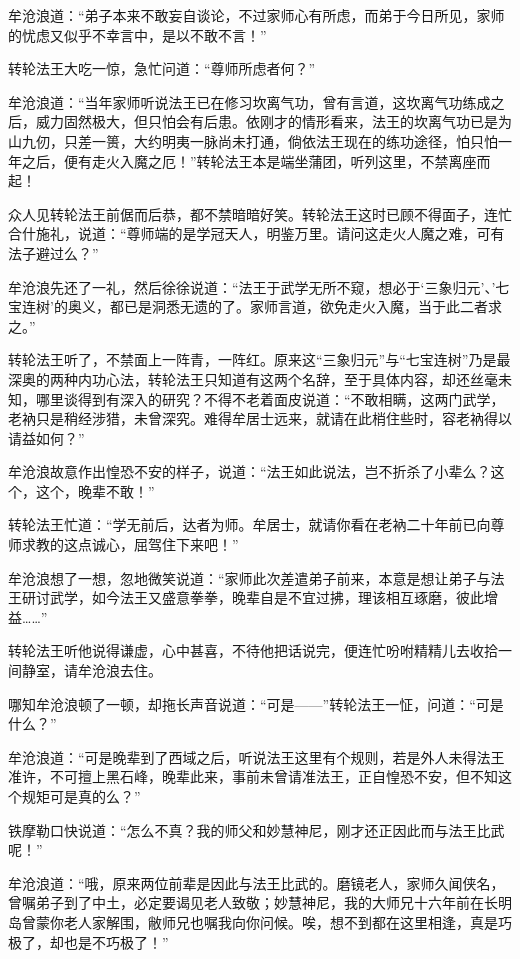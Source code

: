 \documentclass[12pt,oneside]{book}
\begin{document}
牟沧浪道：``弟子本来不敢妄自谈论，不过家师心有所虑，而弟于今日所见，家师的忧虑又似乎不幸言中，是以不敢不言！''

转轮法王大吃一惊，急忙问道：``尊师所虑者何？''

牟沧浪道：``当年家师听说法王已在修习坎离气功，曾有言道，这坎离气功练成之后，威力固然极大，但只怕会有后患。依刚才的情形看来，法王的坎离气功已是为山九仞，只差一篑，大约明夷一脉尚未打通，倘依法王现在的练功途径，怕只怕一年之后，便有走火入魔之厄！''转轮法王本是端坐蒲团，听列这里，不禁离座而起！

众人见转轮法王前倨而后恭，都不禁暗暗好笑。转轮法王这时已顾不得面子，连忙合什施礼，说道：``尊师端的是学冠天人，明鉴万里。请问这走火人魔之难，可有法子避过么？''

牟沧浪先还了一礼，然后徐徐说道：``法王于武学无所不窥，想必于`三象归元'、'七宝连树'的奥义，都已是洞悉无遗的了。家师言道，欲免走火入魔，当于此二者求之。''

转轮法王听了，不禁面上一阵青，一阵红。原来这``三象归元''与``七宝连树''乃是最深奥的两种内功心法，转轮法王只知道有这两个名辞，至于具体内容，却还丝毫未知，哪里谈得到有深入的研究？不得不老着面皮说道：``不敢相瞒，这两门武学，老衲只是稍经涉猎，未曾深究。难得牟居士远来，就请在此梢住些时，容老衲得以请益如何？''

牟沧浪故意作出惶恐不安的样子，说道：``法王如此说法，岂不折杀了小辈么？这个，这个，晚辈不敢！''

转轮法王忙道：``学无前后，达者为师。牟居士，就请你看在老衲二十年前已向尊师求教的这点诚心，屈驾住下来吧！''

牟沧浪想了一想，忽地微笑说道：``家师此次差遣弟子前来，本意是想让弟子与法王研讨武学，如今法王又盛意拳拳，晚辈自是不宜过拂，理该相互琢磨，彼此增益\ldots\ldots{}''

转轮法王听他说得谦虚，心中甚喜，不待他把话说完，便连忙吩咐精精儿去收拾一间静室，请牟沧浪去住。

哪知牟沧浪顿了一顿，却拖长声音说道：``可是------''转轮法王一怔，问道：``可是什么？''

牟沧浪道：``可是晚辈到了西域之后，听说法王这里有个规则，若是外人未得法王准许，不可擅上黑石峰，晚辈此来，事前未曾请准法王，正自惶恐不安，但不知这个规矩可是真的么？''

铁摩勒口快说道：``怎么不真？我的师父和妙慧神尼，刚才还正因此而与法王比武呢！''

牟沧浪道：``哦，原来两位前辈是因此与法王比武的。磨镜老人，家师久闻侠名，曾嘱弟子到了中土，必定要谒见老人致敬；妙慧神尼，我的大师兄十六年前在长明岛曾蒙你老人家解围，敝师兄也嘱我向你问候。唉，想不到都在这里相逢，真是巧极了，却也是不巧极了！''
\end{document}
